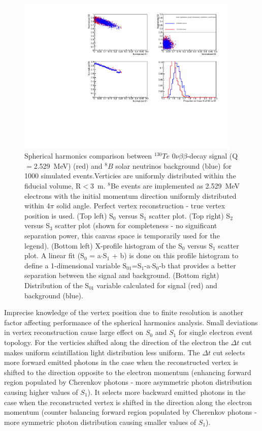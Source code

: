\documentclass[12pt,twoside,letterpaper]{article}
\newcommand{\vbb}{0\nu\beta\beta}
\newcommand{\Te}{^{130}Te}
\newcommand{\B}{^{8}B}
\begin{document}
\begin{figure}[htb]
\centering
\includegraphics[angle=0,width=0.95\textwidth]{plots/hSLPlots_Te_allLight_VtxSmear0cm_VtxShiftX0cm_momDT1p0ns_rndVtx_3p0mSphere.pdf}
\caption{Spherical harmonics comparison between $\Te$ $\vbb$-decay signal (Q$=$2.529~MeV) (red) and $\B$ solar neutrinos background (blue) for 1000 simulated events.Verticies are uniformly distributed within the fiducial volume, R$<$3~m. $^8$Be events are implemented as 2.529~MeV electrons with the initial momentum direction uniformly distributed within 4$\pi$ solid angle. Perfect vertex reconstruction - true vertex position is used. (Top left) S$_0$ versus S$_1$ scatter plot. (Top right) S$_2$ versus S$_3$ scatter plot (shown for completeness - no significant separation power, this canvas space is temporarily used for the legend). (Bottom left) X-profile histogram of the S$_0$ versus S$_1$ scatter plot. A linear fit (S$_0$ = a$\cdot$S$_1$ + b) is done on this profile histogram to define a 1-dimensional variable S$_{01}$=S$_1$-a$\cdot$S$_0$-b that provides a better separation between the signal and background. (Bottom right) Distribution of the S$_{01}$ variable calculated for signal (red) and background (blue).}
\label{fig:SL_Te_SmearX0cm_momDT1ns_rndVtx_3p0m}
\end{figure}

Imprecise knowledge of the vertex position due to finite resolution is another factor affecting performance of the spherical harmonics analysis. Small deviations in vertex reconstruction cause large effect on $S_0$ and $S_1$ for single electron event topology. For the verticies shifted along the direction of the electron the $\Delta t$ cut makes uniform scintillation light distribution less uniform. The $\Delta t$ cut selects more forward emitted photons in the case when the reconstructed vertex is shifted to the direction opposite to the electron momentum (enhancing forward region populated by Cherenkov photons - more asymmetric photon distribution causing higher values of $S_1$). It selects more backward emitted photons in the case when the reconstructed vertex is shifted in the direction along the electron momentum (counter balancing forward region populated by Cherenkov photons - more symmetric photon distribution causing smaller values of $S_1$).
\end{document}

